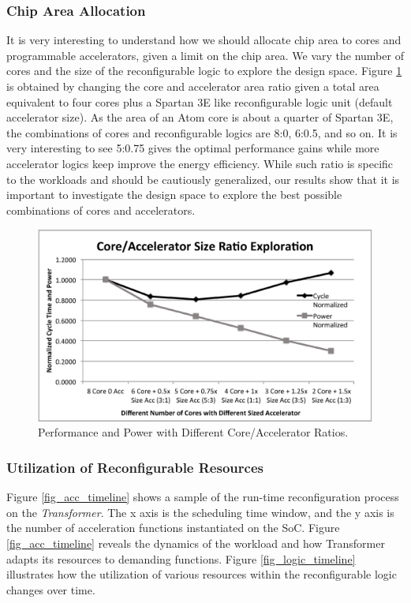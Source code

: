 \subsubsection{Chip Area Allocation}

It is very interesting to understand how we should allocate chip
area to cores and programmable accelerators, given a limit on the chip
area. We vary the number of cores and the size of the
reconfigurable logic to explore the design space. Figure
\ref{fig_core_acc_ratio} is obtained by changing the core and
accelerator area ratio given a total area equivalent to four cores
plus a Spartan 3E like reconfigurable logic unit (default
accelerator size). As the area of an Atom core is about
    a quarter of Spartan 3E, the combinations of cores and reconfigurable
logics are 8:0, 6:0.5, and so on. It is very interesting to see
 5:0.75 gives the optimal performance gains while more accelerator
logics keep improve the energy efficiency. While such ratio is
specific to the workloads and should be cautiously generalized, 
our results show that it is important to
investigate the design space to explore the best possible
combinations of cores and accelerators. 

\begin{figure}
    \centering
    \includegraphics[width=4.5in]{Core-Acc-Size-Ratio}
    \caption{Performance and Power with Different Core/Accelerator Ratios.}
    \label{fig_core_acc_ratio}
\end{figure}

\subsubsection{Utilization of Reconfigurable Resources}

Figure \ref{fig_acc_timeline} shows a sample of the run-time
reconfiguration process on the {\em Transformer}. The x axis is the
scheduling time window, and the y axis is the number of acceleration
functions instantiated on the SoC.  Figure \ref{fig_acc_timeline}
reveals the dynamics of the workload and how {Transformer} adapts its
resources to demanding functions. Figure \ref{fig_logic_timeline}
illustrates how the utilization of various resources within the
reconfigurable logic changes over time.

